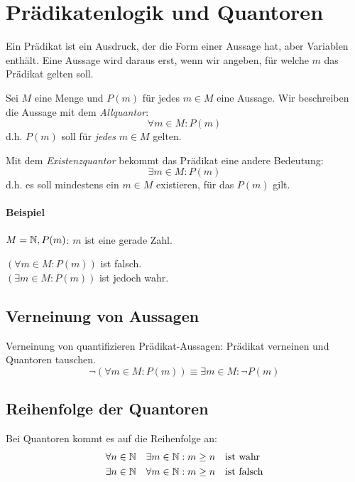 \section{Prädikatenlogik und Quantoren}
Ein Prädikat ist ein Ausdruck, der die Form einer Aussage hat, aber Variablen enthält.
Eine Aussage wird daraus erst, wenn wir angeben, für welche $m$ das Prädikat gelten soll.

Sei $M$ eine Menge und $P(m)$ für jedes $m\in M$ eine Aussage. Wir beschreiben die Aussage mit dem \emph{Allquantor}:
\begin{equation*}
  \forall m\in M: P(m)
\end{equation*}
d.h. $P(m)$ soll für \emph{jedes} $m\in M$ gelten.
\par\medskip
Mit dem \emph{Existenzquantor} bekommt das Prädikat eine andere Bedeutung:
\begin{equation*}
  \exists m\in M: P(m)
\end{equation*}
d.h. es soll mindestens ein $m\in M$ existieren, für das $P(m)$ gilt.

\paragraph{Beispiel}
$M=\mathbb{N}, P(m)$: \glqq $m$ ist eine gerade Zahl.\grqq

$(\forall m\in M: P(m))$ ist falsch. \\
$(\exists m\in M: P(m))$ ist jedoch wahr.

\subsection{Verneinung von Aussagen}
Verneinung von quantifizieren Prädikat-Aussagen:
\glqq Prädikat verneinen und Quantoren tauschen.\grqq
\begin{equation*}
  \neg(\forall m\in M: P(m)) \equiv  \exists m\in M: \neg P(m)
\end{equation*}
\subsection{Reihenfolge der Quantoren}
Bei Quantoren kommt es auf die Reihenfolge an:
\begin{align*}
  \forall n\in\mathbb{N} \quad\exists m\in \mathbb{N} &: m\geq n \quad\text{ist wahr}\\
  \exists n\in\mathbb{N} \quad\forall m\in \mathbb{N} &: m\geq n \quad\text{ist falsch}\\
\end{align*}
